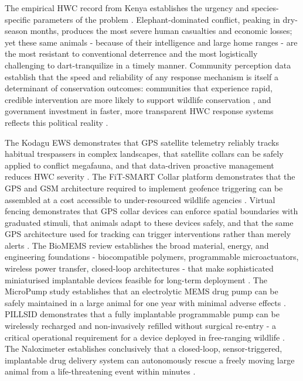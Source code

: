 \documentclass[12pt,a4paper]{article}
\begin{document}
    The empirical HWC record from Kenya establishes the urgency and species-specific
    parameters of the problem \cite{manoa2020}. Elephant-dominated conflict, peaking in dry-season
    months, produces the most severe human casualties and economic losses; yet these same
    animals - because of their intelligence and large home ranges - are the most resistant to
    conventional deterrence and the most logistically challenging to dart-tranquilize in a timely
    manner. Community perception data establish that the speed and reliability of any response
    mechanism is itself a determinant of conservation outcomes: communities that experience
    rapid, credible intervention are more likely to support wildlife conservation \cite{basak2023},
    and government investment in faster, more transparent HWC response systems reflects this
    political reality \cite{kenya2025}.

    The Kodagu EWS demonstrates that GPS satellite telemetry reliably tracks habitual
    trespassers in complex landscapes, that satellite collars can be safely applied to conflict
    megafauna, and that data-driven proactive management reduces HWC severity \cite{muliya2026}.
    The FiT-SMART Collar platform demonstrates that the GPS and GSM architecture required
    to implement geofence triggering can be assembled at a cost accessible to under-resourced
    wildlife agencies \cite{imamoglu2022}. Virtual fencing demonstrates that GPS collar devices
    can enforce spatial boundaries with graduated stimuli, that animals adapt to these devices
    safely, and that the same GPS architecture used for tracking can trigger interventions rather
    than merely alerts \cite{gilbert2026}. The BioMEMS review establishes the broad material,
    energy, and engineering foundations - biocompatible polymers, programmable
    microactuators, wireless power transfer, closed-loop architectures - that make
    sophisticated miniaturised implantable devices feasible for long-term deployment
    \cite{abhinav2025}. The MicroPump study establishes that an electrolytic MEMS drug pump
    can be safely maintained in a large animal for one year with minimal adverse effects
    \cite{gutierrez2014}. PILLSID demonstrates that a fully implantable programmable pump can
    be wirelessly recharged and non-invasively refilled without surgical re-entry - a critical
    operational requirement for a device deployed in free-ranging wildlife \cite{iacovacci2021}.
    The Naloximeter establishes conclusively that a closed-loop, sensor-triggered, implantable
    drug delivery system can autonomously rescue a freely moving large animal from a
    life-threatening event within minutes \cite{ciatti2024}.
\end{document}
